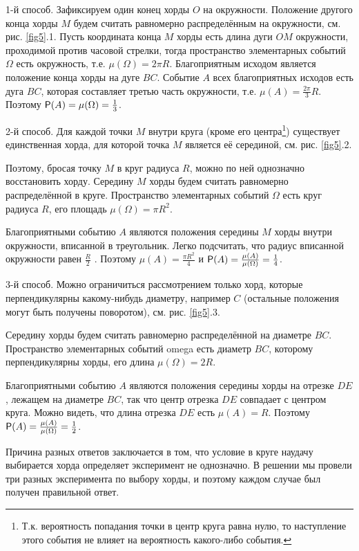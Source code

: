 \begin{example}
1-й способ. Зафиксируем один конец хорды $O$ на окружности. Положение другого конца хорды $M$ будем считать равномерно распределённым на окружности, см. рис. \ref{fig5}.1. Пусть координата конца $M$ хорды есть длина дуги $OM$ окружности, проходимой против часовой стрелки, тогда пространство элементарных событий $\Omega$ есть окружность, т.е. $\mu(\Omega) = 2 \pi R$. Благоприятным
исходом является положение конца хорды на дуге $BC$. Событие $A$ всех благоприятных исходов есть дуга $BC$, которая составляет третью часть окружности, т.е. $\mu(A) = \frac{2 \pi}{3} R$. Поэтому $\P(A) = \mu(\Omega) = \frac{1}{3}$.

2-й способ. Для каждой точки $M$ внутри круга (кроме его центра\footnote{
Т.к. вероятность попадания точки в центр круга равна нулю, то наступление этого события не влияет
на вероятность какого-либо события.
}) 
существует единственная хорда, для которой точка $M$ является её серединой, см. рис. \ref{fig5}.2. 

Поэтому, бросая точку $M$ в круг радиуса $R$, можно по ней однозначно восстановить хорду. Середину $M$ хорды будем считать равномерно распределённой в круге. Пространство элементарных событий $\Omega$ есть круг
радиуса $R$, его площадь $\mu(\Omega) = \pi R^2$. 

Благоприятными событию $A$ являются положения середины $M$ хорды внутри окружности, вписанной в треугольник. Легко подсчитать, что радиус вписанной окружности равен $\frac{R}{2}$ . Поэтому $\mu(A) = \frac{\pi R^2}{4}$ и $\P(A) = \frac{\mu(A)}{\mu(\Omega)} = \frac{1}{4}$.

3-й способ. Можно ограничиться рассмотрением только хорд, которые перпендикулярны какому-нибудь диаметру, например $C$ (остальные положения могут быть получены поворотом), см. рис. \ref{fig5}.3. 

Середину хорды будем считать равномерно распределённой на диаметре $BC$. Пространство элементарных событий omega есть диаметр $BC$, которому перпендикулярны хорды, его длина $\mu(\Omega) = 2R$. 

Благоприятными событию $A$ являются положения середины хорды на отрезке $DE$, лежащем на диаметре $BC$, так что центр отрезка $DE$ совпадает с центром круга. Можно видеть, что длина отрезка $DE$ есть $\mu(A) = R$. Поэтому $\P(A) = \frac{\mu(A)}{\mu(\Omega)} = \frac{1}{2}$.

Причина разных ответов заключается в том, что условие в круге наудачу выбирается хорда определяет эксперимент не однозначно. В решении мы провели три разных эксперимента по выбору хорды, и поэтому каждом случае был получен правильной ответ.

\end{example}

% 